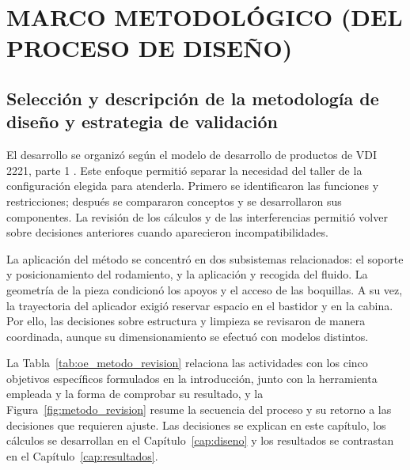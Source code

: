 \chapter{MARCO METODOLÓGICO (DEL PROCESO DE DISEÑO)}
\label{cap:metodologia}

\section{Selección y descripción de la metodología de diseño y estrategia de validación}
\label{sec:metodo-diseno}

El desarrollo se organizó según el modelo de desarrollo de productos de VDI 2221, parte 1 \cite{vdi2221}. Este enfoque permitió separar la necesidad del taller de la configuración elegida para atenderla. Primero se identificaron las funciones y restricciones; después se compararon conceptos y se desarrollaron sus componentes. La revisión de los cálculos y de las interferencias permitió volver sobre decisiones anteriores cuando aparecieron incompatibilidades.

La aplicación del método se concentró en dos subsistemas relacionados: el soporte y posicionamiento del rodamiento, y la aplicación y recogida del fluido. La geometría de la pieza condicionó los apoyos y el acceso de las boquillas. A su vez, la trayectoria del aplicador exigió reservar espacio en el bastidor y en la cabina. Por ello, las decisiones sobre estructura y limpieza se revisaron de manera coordinada, aunque su dimensionamiento se efectuó con modelos distintos.

La Tabla~\ref{tab:oe_metodo_revision} relaciona las actividades con los cinco objetivos específicos formulados en la introducción, junto con la herramienta empleada y la forma de comprobar su resultado, y la Figura~\ref{fig:metodo_revision} resume la secuencia del proceso y su retorno a las decisiones que requieren ajuste. Las decisiones se explican en este capítulo, los cálculos se desarrollan en el Capítulo~\ref{cap:diseno} y los resultados se contrastan en el Capítulo~\ref{cap:resultados}.

